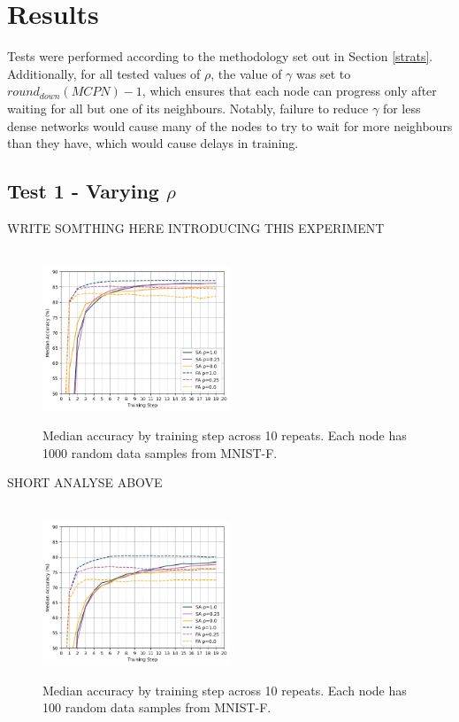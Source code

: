\documentclass[letterpaper, 10 pt, conference]{ieeeconf}  %
\begin{document}
\section{Results}
Tests were performed according to the methodology set out in Section \ref{strats}. Additionally, for all tested values of $\rho$, the value of $\gamma$ was set to $round_{down}(MCPN) - 1$, which ensures that each node can progress only after waiting for all but one of its neighbours. Notably, failure to reduce $\gamma$ for less dense networks would cause many of the nodes to try to wait for more neighbours than they have, which would cause delays in training.

\subsection{Test 1 - Varying $\rho$}
WRITE SOMTHING HERE INTRODUCING THIS EXPERIMENT

\begin{figure}[H]
	 \\
	\includegraphics[width=0.5\textwidth]{conf_sparse_ns1000}
	\caption{Median accuracy by training step across 10 repeats. Each node has 1000 random data samples from MNIST-F.}
	\label{aeg4}
\end{figure}

SHORT ANALYSE ABOVE

\begin{figure}[H] 
	 \\
	\includegraphics[width=0.5\textwidth]{conf_sparse_ns100}
	\caption{Median accuracy by training step across 10 repeats. Each node has 100 random data samples from MNIST-F.}
	\label{aeg5}
\end{figure}
\end{document}
